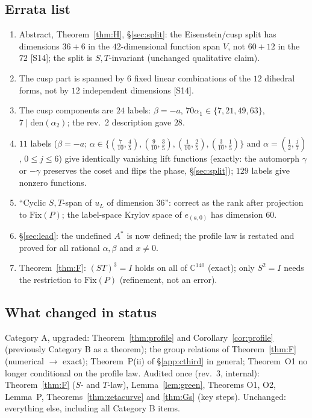 \documentclass[11pt]{article}
\theoremstyle{definition}
\theoremstyle{plain}
\newcommand{\C}{\mathbb{C}}
\newcommand{\src}[1]{\textup{[S#1]}}
\begin{document}
\subsection{Errata list}
\begin{enumerate}[label=\textbf{R3.\arabic*},leftmargin=3.2em]
\item Abstract, Theorem~\ref{thm:H}, \S\ref{sec:split}: the Eisenstein/cusp split has dimensions $36+6$ in the $42$-dimensional function span $V$, not $60+12$ in
the $72$ \src{14}; the split is $S,T$-invariant (unchanged qualitative claim).
\item The cusp part is spanned by $6$ fixed linear combinations of the $12$ dihedral forms, not by $12$ independent dimensions \src{14}.
\item The cusp components are $24$ labels: $\beta=-a$, $70\alpha_1\in\{7,21,49,63\}$, $7\mid\mathrm{den}(\alpha_2)$; the rev.~2 description gave $28$.
\item $11$ labels ($\beta=-a$; $\alpha\in\{(\tfrac7{10},\tfrac45),(\tfrac9{10},\tfrac35),(\tfrac1{10},\tfrac25),(\tfrac3{10},\tfrac15)\}$ and $\alpha=(\tfrac12,\tfrac j7)$, $0\le j\le6$) give
identically vanishing lift functions (exactly: the automorph $\gamma$ or $-\gamma$ preserves the coset and flips the phase, \S\ref{sec:split}); $129$ labels give nonzero functions.
\item ``Cyclic $S,T$-span of $u_L$ of dimension $36$'': correct as the rank after projection to $\mathrm{Fix}(P)$; the label-space Krylov space of $e_{(a,0)}$ has
dimension $60$.
\item \S\ref{sec:lead}: the undefined $A^*$ is now defined; the profile law is restated and proved for all rational $\alpha,\beta$ and $x\neq0$.
\item Theorem~\ref{thm:F}: $(ST)^3=I$ holds on all of $\C^{140}$ (exact); only $S^2=I$ needs the restriction to $\mathrm{Fix}(P)$ (refinement, not an error).
\end{enumerate}

\subsection{What changed in status}
Category A, upgraded: Theorem~\ref{thm:profile} and Corollary~\ref{cor:profile} (previously Category B as a theorem); the group relations of
Theorem~\ref{thm:F} (numerical $\to$ exact); Theorem~P(ii) of \S\ref{app:cthird} in general; Theorem~O1 no longer conditional on the profile law.
Audited once (rev.~3, internal): Theorem~\ref{thm:F} ($S$- and $T$-law), Lemma~\ref{lem:green}, Theorems O1, O2, Lemma~P, Theorems~\ref{thm:zetacurve} and
\ref{thm:Gs} (key steps). Unchanged: everything else, including all Category B items.
\end{document}

